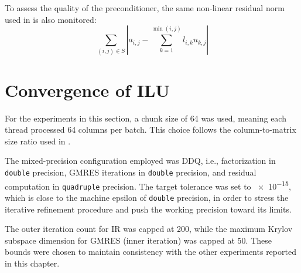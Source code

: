To assess the quality of the preconditioner, the same non-linear residual norm
used in \cite{chow_fine-grained_2015} is also monitored:
\begin{equation}
  \label{eq:nonlin}
  \sum_{(i,j) \in S}
  \left| a_{i,j} - \sum_{k=1}^{\min(i,j)} l_{i,k}u_{k,j} \right|
\end{equation}

\section{Convergence of ILU}
\label{sec:convergence-ilu}

For the experiments in this section, a chunk size of 64 was used, meaning each
thread processed 64 columns per batch. This choice follows the column-to-matrix
size ratio used in \cite{chow_fine-grained_2015}.

The mixed-precision configuration employed was DDQ, i.e., factorization in
\texttt{double} precision, GMRES iterations in \texttt{double} precision, and
residual computation in \texttt{quadruple} precision. The target tolerance was set
to \num{e-15}, which is close to the machine epsilon of \texttt{double}
precision, in order to stress the iterative refinement procedure and push the
working precision toward its limits.

The outer iteration count for IR was capped at 200, while the maximum Krylov
subspace dimension for GMRES (inner iteration) was capped at 50. These bounds
were chosen to maintain consistency with the other experiments reported in this
chapter.

